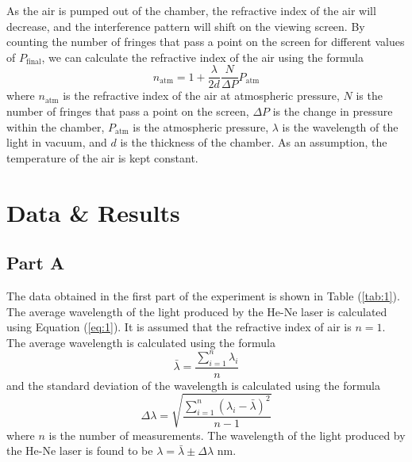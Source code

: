 \documentclass[10pt]{article}
\begin{document}
As the air is pumped out of the chamber, the refractive index of the air will decrease, and the interference pattern will shift on the viewing screen. By counting the number of fringes that pass a point on the screen for different values of $P_{\text{final}}$, we can calculate the refractive index of the air using the formula
\begin{equation}
  n_{\text{atm}} = 1 + \dfrac{\lambda}{2d} \dfrac{N}{\Delta P} P_{\text{atm}}
\end{equation}
where $n_{\text{atm}}$ is the refractive index of the air at atmospheric pressure, $N$ is the number of fringes that pass a point on the screen, $\Delta P$ is the change in pressure within the chamber, $P_{\text{atm}}$ is the atmospheric pressure, $\lambda$ is the wavelength of the light in vacuum, and $d$ is the thickness of the chamber. As an assumption, the temperature of the air is kept constant. 

\section{Data \& Results}

\subsection*{Part A}

The data obtained in the first part of the experiment is shown in Table (\ref{tab:1}). The average wavelength of the light produced by the He-Ne laser is calculated using Equation (\ref{eq:1}). It is assumed that the refractive index of air is $n = 1$. The average wavelength is calculated using the formula
\begin{equation}
  \bar{\lambda} = \dfrac{\sum_{i=1}^{n} \lambda_i}{n}
  \label{eq:3}
\end{equation}
and the standard deviation of the wavelength is calculated using the formula
\begin{equation}
  \Delta \lambda = \sqrt{\dfrac{\sum_{i=1}^{n} \left(\lambda_i - \bar{\lambda}\right)^2}{n-1}}
  \label{eq:4}
\end{equation}
where $n$ is the number of measurements. The wavelength of the light produced by the He-Ne laser is found to be $\lambda = \bar{\lambda} \pm \Delta \lambda$ nm.
\end{document}
